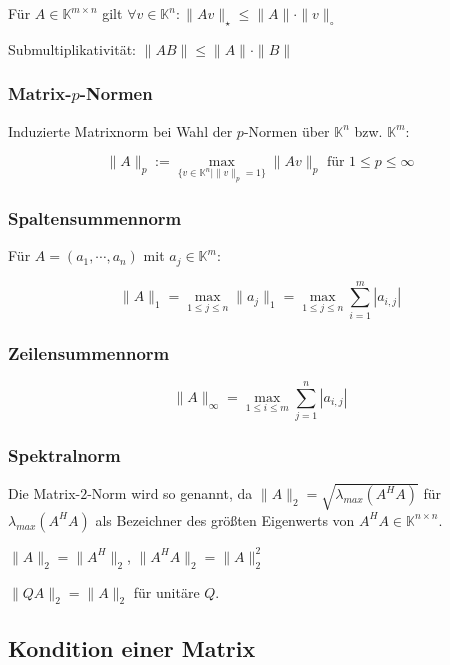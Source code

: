 Für $A \in \mathbb{K}^{m \times n}$ gilt $\forall v \in \mathbb{K}^n : \|Av\|_\star \leq \|A\| \cdot \|v\|_\circ$

Submultiplikativität: $\|AB\| \leq \|A\| \cdot \|B\|$

\subsubsection*{Matrix-$p$-Normen}

Induzierte Matrixnorm bei Wahl der $p$-Normen über $\mathbb{K}^n$ bzw. $\mathbb{K}^m$:

\vspace*{-4mm}
$$\|A\|_p := \max_{\{v \in \mathbb{K}^n | \|v\|_p = 1 \}} \|Av\|_p \text{ für } 1 \leq p \leq \infty$$

\subsubsection*{Spaltensummennorm}

Für $A = (a_1, \cdots, a_n)$ mit $a_j \in \mathbb{K}^m$:

\vspace*{-4mm}
$$\|A\|_1 = \max_{1 \leq j \leq n} \|a_j\|_1 = \max_{1 \leq j \leq n} \sum_{i=1}^m |a_{i,j}|$$

\subsubsection*{Zeilensummennorm}

\vspace*{-4mm}
$$\|A\|_\infty = \max_{1 \leq i \leq m} \sum_{j=1}^n |a_{i,j}|$$

\subsubsection*{Spektralnorm}

Die Matrix-$2$-Norm wird so genannt, da $\|A\|_2 = \sqrt{\lambda_{max}(A^H A)}$ für $\lambda_{max}(A^H A)$ als Bezeichner des größten Eigenwerts von $A^H A \in \mathbb{K}^{n \times n}$.

$\|A\|_2 = \|A^H\|_2$, $\|A^H A\|_2 = \|A\|_2^2$

$\|Q A\|_2 = \|A\|_2$ für unitäre $Q$.

\subsection*{Kondition einer Matrix}

